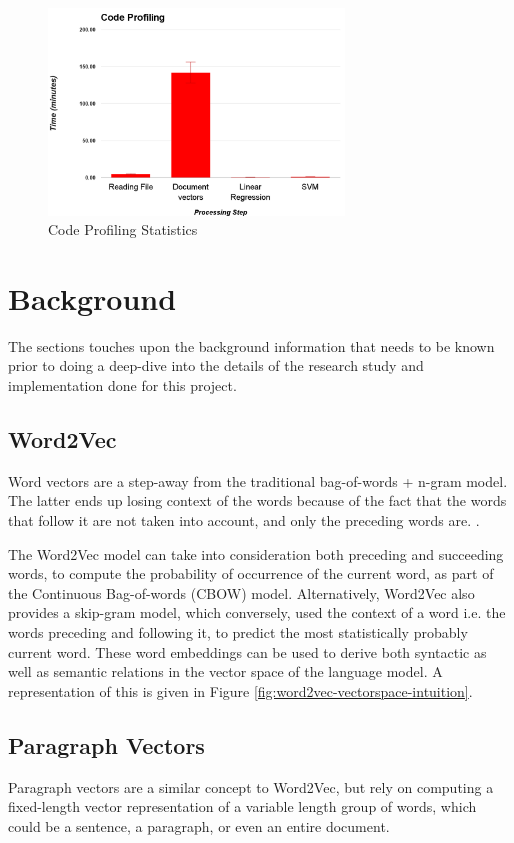 \documentclass[conference]{IEEEtran}
\begin{document}
\begin{figure}[ht] \label{fig:code-profiling}
    \centering
    \includegraphics[width=0.7\textwidth]{images/code_profiling.png}
    \caption{Code Profiling Statistics}
\end{figure}

\section{Background}
    The sections touches upon the background information that needs to be known prior to doing a deep-dive into the details of the research study and implementation done for this project.

    \subsection{Word2Vec} \label{Word2Vec}
        Word vectors are a step-away from the traditional bag-of-words + n-gram model. 
        The latter ends up losing context of the words because of the fact that the words that follow it are not taken into account, and only the preceding words are. .

        The Word2Vec model\cite{mikolov2013efficient} can take into consideration both preceding and succeeding words, to compute the probability of occurrence of the current word, as part of the Continuous Bag-of-words (CBOW) model. 
        Alternatively, Word2Vec also provides a skip-gram model\cite{mikolov2013distributed}, which conversely, used the context of a word i.e. the words preceding and following it, to predict the most statistically probably current word. 
        These word embeddings can be used to derive both syntactic as well as semantic relations in the vector space of the language model. A representation of this is given in Figure \ref{fig:word2vec-vectorspace-intuition}.

    \subsection{Paragraph Vectors} \label{paragraph_vectors}
        Paragraph vectors are a similar concept to Word2Vec, but rely on computing a fixed-length vector representation of a variable length group of words, which could be a sentence, a paragraph, or even an entire document.
\end{document}
